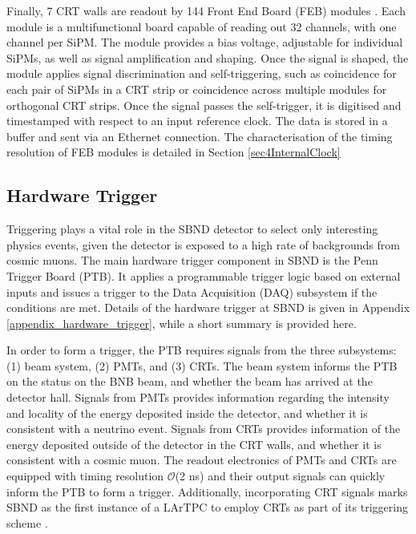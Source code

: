 Finally, 7 CRT walls are readout by 144 Front End Board (FEB) modules \cite{crt_note}.%
Each module is a multifunctional board capable of reading out 32 channels, with one channel per SiPM. 
The module provides a bias voltage, adjustable for individual SiPMs, as well as signal amplification and shaping.
Once the signal is shaped, the module applies signal discrimination and self-triggering, such as coincidence for each pair of SiPMs in a CRT strip or coincidence across multiple modules for orthogonal CRT strips. 
Once the signal passes the self-trigger, it is digitised and timestamped with respect to an input reference clock. 
The data is stored in a buffer and sent via an Ethernet connection. 
The characterisation of the timing resolution of FEB modules is detailed in Section \ref{sec4InternalClock}

\subsection{Hardware Trigger}
\label{sec:sbnd_trigger}

Triggering plays a vital role in the SBND detector to select only interesting physics events, given the detector is exposed to a high rate of backgrounds from cosmic muons. 
The main hardware trigger component in SBND is the Penn Trigger Board (PTB).
It applies a programmable trigger logic based on external inputs and issues a trigger to the Data Acquisition (DAQ) subsystem if the conditions are met.
Details of the hardware trigger at SBND is given in Appendix \ref{appendix_hardware_trigger}, while a short summary is provided here.

In order to form a trigger, the PTB requires signals from the three subsystems: (1) beam system, (2) PMTs, and (3) CRTs.
The beam system informs the PTB on the status on the BNB beam, and whether the beam has arrived at the detector hall.
Signals from PMTs provides information regarding the intensity and locality of the energy deposited inside the detector, and whether it is consistent with a neutrino event.
Signals from CRTs provides information of the energy deposited outside of the detector in the CRT walls, and whether it is consistent with a cosmic muon. 
The readout electronics of PMTs and CRTs are equipped with timing resolution $\mathcal{O}$(2 ns) and their output signals can quickly inform the PTB to form a trigger.
Additionally, incorporating CRT signals marks SBND as the first instance of a LArTPC to employ CRTs as part of its triggering scheme \cite{CPAD2022}.

